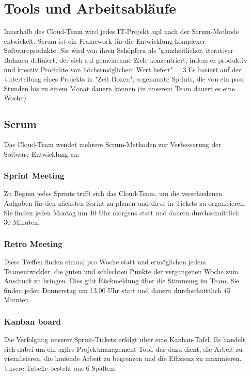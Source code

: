 \section{Tools und Arbeitsabläufe}

Innerhalb des Cloud-Team wird jedes IT-Projekt agil nach der Scrum-Methode entwickelt.
Scrum ist ein Framework für die Entwicklung komplexer Softwareprodukte.
Sie wird von ihren Schöpfern als "ganzheitlicher, iterativer Rahmen definiert, der sich auf gemeinsame Ziele konzentriert, indem er produktiv und kreativ Produkte von höchstmöglichem Wert liefert" \cite{ScrumGuide}.
13
Es basiert auf der Unterteilung eines Projekts in "Zeit Boxen", sogenannte Sprints, die von ein paar Stunden bis zu einem Monat dauern können (in unserem Team dauert es eine Woche)

\subsection{Scrum} \label{sec:scrum}

Das Cloud-Team wendet mehrere Scrum-Methoden zur Verbesserung der
Software-Entwicklung an:

\subsubsection{Sprint Meeting}
Zu Beginn jedes Sprints trifft sich das Cloud-Team, um die verschiedenen Aufgaben für den nächsten Sprint zu planen und diese in Tickets zu organisieren.
Sie finden jeden Montag um 10 Uhr morgens statt und dauern durchschnittlich 30 Minuten.

\subsubsection{Retro Meeting}
Diese Treffen finden einmal pro Woche statt und ermöglichen jedem Teamentwickler, die guten und schlechten Punkte der vergangenen Woche zum Ausdruck zu bringen.
Dies gibt Rückmeldung über die Stimmung im Team. Sie finden jeden Donnerstag um 13.00 Uhr statt und dauern durchschnittlich 45 Minuten.

\subsubsection{Kanban board}
Die Verfolgung unserer Sprint-Tickets erfolgt über eine Kanban-Tafel.
Es handelt sich dabei um ein agiles Projektmanagement-Tool, das dazu dient, die Arbeit zu visualisieren, die laufende Arbeit zu begrenzen und die Effizienz zu maximieren.
Unsere Tabelle besteht aus 6 Spalten:

